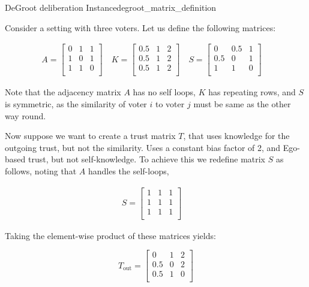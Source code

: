 \begin{example}{DeGroot deliberation Instance}{degroot_matrix_definition}

	Consider a setting with three voters. Let us define the following matrices:

	\begin{align}
		A = \begin{bmatrix}
			    0 & 1 & 1 \\
			    1 & 0 & 1 \\
			    1 & 1 & 0 \\
		    \end{bmatrix} \quad
		K = \begin{bmatrix}
			    0.5 & 1 & 2 \\
			    0.5 & 1 & 2 \\
			    0.5 & 1 & 2 \\
		    \end{bmatrix}\quad
		S = \begin{bmatrix}
			    0   & 0.5 & 1 \\
			    0.5 & 0   & 1 \\
			    1   & 1   & 0 \\
		    \end{bmatrix}\quad
	\end{align}

	Note that the adjacency matrix $A$ has no self loops, $K$ has repeating
	rows, and $S$ is symmetric, as the similarity of voter $i$ to voter $j$
	must be same as the other way round.

	Now suppose we want to create a trust matrix $T$, that uses knowledge for the
	outgoing trust, but not the similarity. Uses a constant bias
	factor of 2, and Ego-based trust, but not self-knowledge. To achieve
	this we redefine matrix $S$ as follows, noting that $A$ handles the self-loops,

	\begin{align}
		S = \begin{bmatrix}
			    1 & 1 & 1 \\
			    1 & 1 & 1 \\
			    1 & 1 & 1 \\
		    \end{bmatrix}\quad
	\end{align}

	Taking the element-wise product of these matrices yields:

	$$T_{\text{out}} = \begin{bmatrix}
			0   & 1 & 2 \\
			0.5 & 0 & 2 \\
			0.5 & 1 & 0 \\
		\end{bmatrix}$$


\end{example}
